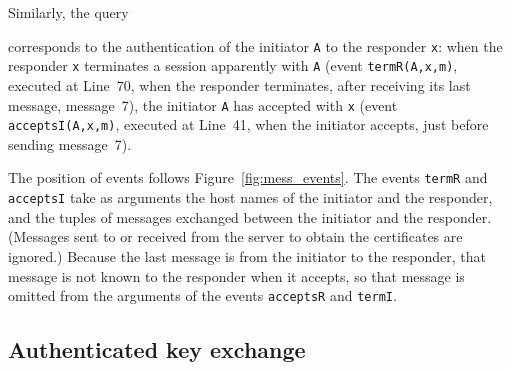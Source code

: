 \documentclass{book}
\begin{document}
Similarly, the query
%

%
corresponds to the authentication of the initiator \lstinline!A! to
the responder \lstinline!x!: when the responder \lstinline!x!
terminates a session apparently with \lstinline!A! (event
\lstinline!termR(A,x,m)!, executed at Line~70, when the responder
terminates, after receiving its last message, message~7), the
initiator \lstinline!A!  has accepted with \lstinline!x! (event
\lstinline!acceptsI(A,x,m)!, executed at Line~41, when the initiator
accepts, just before sending message~7).

The position of events follows Figure~\ref{fig:mess_events}.  The
events \lstinline!termR! and \lstinline!acceptsI! take as arguments
the host names of the initiator and the responder, and the tuples of
messages exchanged between the initiator and the responder. (Messages
sent to or received from the server to obtain the certificates are
ignored.)  Because the last message is from the initiator to the
responder, that message is not known to the
responder when it accepts, so that message is omitted from
the arguments of the events \lstinline!acceptsR! and
\lstinline!termI!.


\subsection{Authenticated key exchange}
\label{sec:var:ake}
\end{document}
